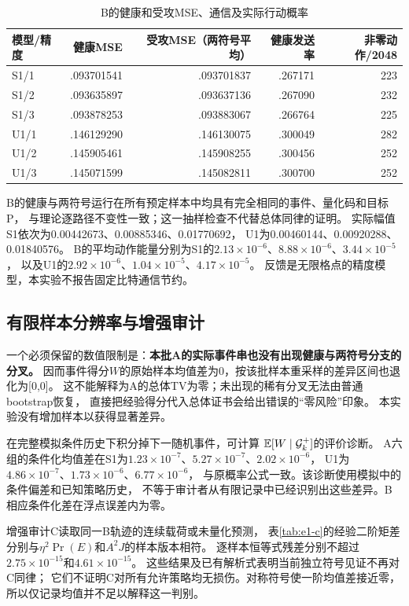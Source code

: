 \begin{table}[ht]
\centering\small
\caption{B的健康和受攻MSE、通信及实际行动概率}
\label{tab:e1-health}
\begin{tabular}{lrrrr}
\toprule
模型/精度 & 健康MSE & 受攻MSE（两符号平均） & 健康发送率 & 非零动作/2048\\
\midrule
S1/1 & .093701541 & .093701837 & .267171 & 223\\
S1/2 & .093635897 & .093637136 & .267090 & 232\\
S1/3 & .093878253 & .093883067 & .266764 & 225\\
U1/1 & .146129290 & .146130075 & .300049 & 282\\
U1/2 & .145905461 & .145908255 & .300456 & 252\\
U1/3 & .145071599 & .145082811 & .300700 & 252\\
\bottomrule
\end{tabular}
\end{table}
B的健康与两符号运行在所有预定样本中均具有完全相同的事件、量化码和目标P，
与理论逐路径不变性一致；这一抽样检查不代替总体同律的证明。
实际幅值S1依次为0.00442673、0.00885346、0.01770692，
U1为0.00460144、0.00920288、0.01840576。
B的平均动作能量分别为S1的$2.13\times10^{-6}$、$8.88\times10^{-6}$、$3.44\times10^{-5}$，
以及U1的$2.92\times10^{-6}$、$1.04\times10^{-5}$、$4.17\times10^{-5}$。
反馈是无限格点的精度模型，本实验不报告固定比特通信节约。

\subsection{有限样本分辨率与增强审计}
一个必须保留的数值限制是：\textbf{本批A的实际事件串也没有出现健康与两符号分支的分叉。}
因而事件得分$W$的原始样本均值差为0，按该批样本重采样的差异区间也退化为[0,0]。
这不能解释为A的总体TV为零；未出现的稀有分叉无法由普通bootstrap恢复，
直接把经验得分代入总体证书会给出错误的“零风险”印象。
本实验没有增加样本以获得显著差异。

在完整模拟条件历史下积分掉下一随机事件，可计算
$\mathbb E[W\mid\mathcal G_k^+]$的评价诊断。
A六组的条件化均值差在S1为$1.23\times10^{-7}$、$5.27\times10^{-7}$、$2.02\times10^{-6}$，
U1为$4.86\times10^{-7}$、$1.73\times10^{-6}$、$6.77\times10^{-6}$，
与原概率公式一致。该诊断使用模拟中的条件偏差和已知策略历史，
不等于审计者从有限记录中已经识别出这些差异。B相应条件化差在浮点误差内为零。

增强审计C读取同一B轨迹的连续载荷或未量化预测，
表\ref{tab:e1-c}的经验二阶矩差分别与$\eta^2\Pr(E)$和$A^2J$的样本版本相符。
逐样本恒等式残差分别不超过$2.75\times10^{-15}$和$4.61\times10^{-15}$。
这些结果及已有解析式表明当前独立符号见证不再对C同律；
它们不证明C对所有允许策略均无损伤。对称符号使一阶均值差接近零，
所以仅记录均值并不足以解释这一判别。

